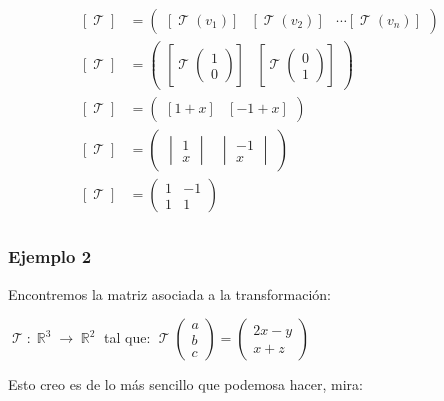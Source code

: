 \documentclass[12pt]{report}                                    %
\DeclareMathOperator \Real {\mathbb{R}}                         %
\DeclareMathOperator \LinealTransformation {\mathcal{T}}        %
\DeclareMathOperator \LT {\mathcal{T}}                          %
\newcommand{\pVector}[1]{                                       %
        \ensuremath{\begin{pmatrix}#1\end{pmatrix}}                 %
    }
\newcommand{\lVector}[1]{                                       %
        \ensuremath{\begin{vmatrix}#1\end{vmatrix}}                 %
    }
\begin{document}
                \begin{equation*}
                \begin{split}
                    [\LT]  &= \pVector{ [\LT(v_1)] & [\LT(v_2)] & \cdots [\LT(v_n)]}        \\
                    [\LT]  &= \pVector{ [\LT\pVector{1\\0}] & [\LT\pVector{0\\1}]  }        \\
                    [\LT]  &= \pVector{ [1+x] & [-1+x]  }                                   \\
                    [\LT]  &= \pVector{ \lVector{1\\x} & \lVector{-1\\x}  }                 \\
                    [\LT]  &= \pVector{ 1 & -1 \\ 1 & 1  }                                  \\
                \end{split}
                \end{equation*}



            \subsubsection{\large Ejemplo 2}
                Encontremos la matriz asociada a la transformación:

                $\LinealTransformation : \Real^3 \to \Real^2$ tal que: 
                $\LinealTransformation \pVector{a\\b\\c} = \pVector{2x-y\\x+z}$

                Esto creo es de lo más sencillo que podemosa hacer, mira:
\end{document}
